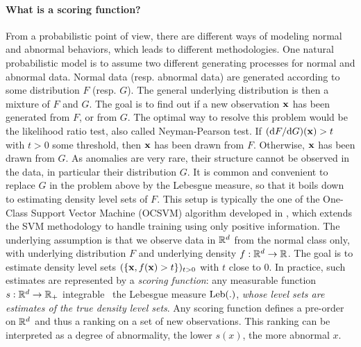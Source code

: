 \paragraph{What is a scoring function?}
From a probabilistic point of view, there are different ways of modeling normal and abnormal behaviors, which leads to different methodologies. One natural probabilistic model is to assume two different generating processes for normal and abnormal data. Normal data (resp. abnormal data) are generated according to some distribution $F$ (resp. $G$). The general underlying distribution is then a mixture of $F$ and $G$. The goal is to find out if a new observation $\mathbf x$ has been generated from $F$, or from $G$. The optimal way to resolve %
this problem would be the likelihood ratio test, also called Neyman-Pearson test. If $(\mathrm{d}  F / \mathrm{d}  G) ( \mathbf x) > t$ with $t>0$ some threshold, then $\mathbf x$ has been drawn from $F$. Otherwise, $\mathbf x$ has been drawn from $G$. %
%
As anomalies are very rare, their structure cannot be observed in the data, in particular their distribution $G$. 
%
It is common and convenient \citep{Vert06thesis} to replace $G$ in the problem above by the Lebesgue measure, so that it boils down to estimating density level sets of $F$. 
%
This setup is typically the one of the One-Class Support Vector Machine (OCSVM) algorithm developed in \cite{Scholkopf2001}, which extends the SVM methodology \citep{Cortes1995, Shawe2004} to handle training using only positive information.
The underlying assumption is that we observe data in $\mathbb{R}^d$ from the normal class only, with underlying distribution $F$ and underlying density $f: \mathbb{R}^d \to \mathbb{R}$. The goal is to estimate density level sets $(\{\mathbf x, f( \mathbf x) > t\})_{t>0}$ with $t$ close to $0$.
%
In practice, such estimates are represented by a \emph{scoring function}: any measurable function $s: \mathbb{R}^d \to \mathbb{R}_+$ integrable \wrt~the Lebesgue measure $\text{Leb}(.)$, \emph{whose level sets are estimates of the true density level sets}. 
Any scoring function defines a pre-order on $\mathbb{R}^d$ and thus a ranking on a set of new observations. This ranking can be interpreted as a degree of abnormality, the lower $s(x)$, the more abnormal $x$. 
